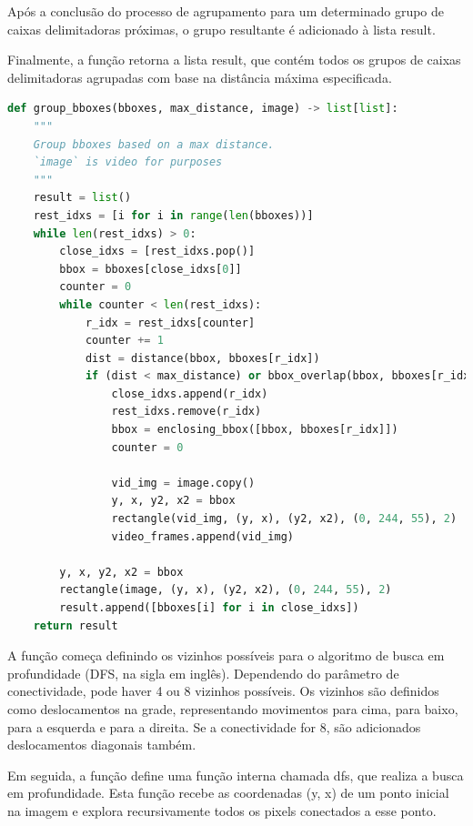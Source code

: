 \documentclass[english, 
               brazil, 
               bsc] %
               {dcomp-abntex2}
\begin{document}
Após a conclusão do processo de agrupamento para um determinado grupo de caixas delimitadoras próximas, o grupo resultante é adicionado à lista result.

Finalmente, a função retorna a lista result, que contém todos os grupos de caixas delimitadoras agrupadas com base na distância máxima especificada.







\begin{codigo}[h]
  \caption{\small.}
 \label{group_bboxes}
\begin{lstlisting}[language=python]
def group_bboxes(bboxes, max_distance, image) -> list[list]:
    """
    Group bboxes based on a max distance.
    `image` is video for purposes
    """
    result = list()
    rest_idxs = [i for i in range(len(bboxes))]
    while len(rest_idxs) > 0:
        close_idxs = [rest_idxs.pop()]
        bbox = bboxes[close_idxs[0]]
        counter = 0
        while counter < len(rest_idxs):
            r_idx = rest_idxs[counter]
            counter += 1
            dist = distance(bbox, bboxes[r_idx])
            if (dist < max_distance) or bbox_overlap(bbox, bboxes[r_idx]):
                close_idxs.append(r_idx)
                rest_idxs.remove(r_idx)
                bbox = enclosing_bbox([bbox, bboxes[r_idx]])
                counter = 0

                vid_img = image.copy()
                y, x, y2, x2 = bbox
                rectangle(vid_img, (y, x), (y2, x2), (0, 244, 55), 2)
                video_frames.append(vid_img)

        y, x, y2, x2 = bbox
        rectangle(image, (y, x), (y2, x2), (0, 244, 55), 2)
        result.append([bboxes[i] for i in close_idxs])
    return result
\end{lstlisting}
\end{codigo}

A função começa definindo os vizinhos possíveis para o algoritmo de busca em profundidade (DFS, na sigla em inglês). Dependendo do parâmetro de conectividade, pode haver 4 ou 8 vizinhos possíveis. Os vizinhos são definidos como deslocamentos na grade, representando movimentos para cima, para baixo, para a esquerda e para a direita. Se a conectividade for 8, são adicionados deslocamentos diagonais também.

Em seguida, a função define uma função interna chamada dfs, que realiza a busca em profundidade. Esta função recebe as coordenadas (y, x) de um ponto inicial na imagem e explora recursivamente todos os pixels conectados a esse ponto.
\end{document}
